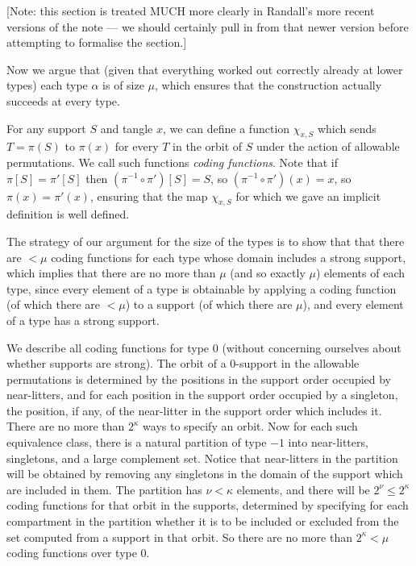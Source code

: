 [Note: this section is treated MUCH more clearly in Randall’s more recent versions of the note — we should certainly pull in from that newer version before attempting to formalise the section.]

Now we argue that (given that everything worked out correctly already at lower types) each type $\alpha$ is of size $\mu$, which ensures
that the construction actually succeeds at every type.

\begin{definition}
\label {def:coding-function}
For any support $S$ and tangle $x$, we can define a function $\chi_{x,S}$ which sends $T=\pi(S)$ to $\pi(x)$ for every $T$ in the orbit of $S$ under
the action of allowable permutations.  We call such functions {\em coding functions\/}.  Note that if $\pi[S]=\pi'[S]$ then $(\pi^{-1}\circ \pi')[S]= S$, so
$(\pi^{-1}\circ \pi')(x)= x$, so $\pi(x)=\pi'(x)$, ensuring that the map $\chi_{x,S}$ for which we gave an implicit definition is well defined.
\end{definition}

The strategy of our argument for the size of the types is to show that that there are $<\mu$ coding functions for each type whose domain includes a strong support, which implies that there are no more than $\mu$ (and so exactly $\mu$) elements of each type, since every element of a type is obtainable by applying a coding function (of which there are $<\mu$) to a support (of which there are $\mu$), and every element of a type has a strong support.

We describe all coding functions for type 0 (without concerning ourselves about whether supports are strong).  The orbit of a 0-support in the allowable permutations is determined by the positions in the support order occupied by near-litters, and for each position in the support order occupied by a singleton, the position, if any, of the near-litter in the support order which includes it.  There are no more than $2^\kappa$ ways to specify an orbit.  Now for each such equivalence class, there is a natural partition of type $-1$ into near-litters, singletons, and a large complement set.  Notice that near-litters in the partition will be obtained by removing any singletons in the domain of the support which are included in them.  The partition has $\nu<\kappa$ elements, and there will be $2^\nu\leq 2^\kappa$ coding functions for that orbit in the supports, determined by specifying for each compartment in the partition whether it is to be included or excluded from the set computed from a support in that orbit.  So there are no more than $2^\kappa<\mu$ coding functions over type 0.


